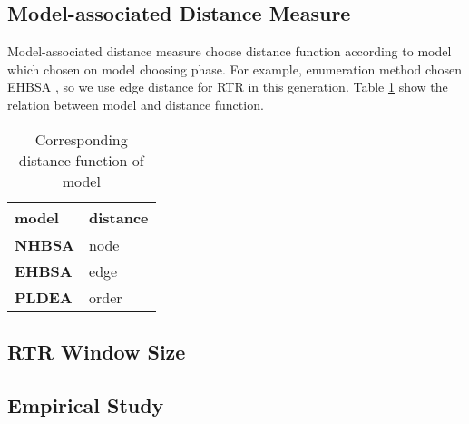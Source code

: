 \subsection{Model-associated Distance Measure}
Model-associated distance measure choose distance function according to model which chosen on model choosing phase. For example, enumeration method chosen EHBSA , so we use edge distance for RTR in this generation. Table \ref{tb:model_distance} show the relation between model and distance function.

\begin{table}[htbp]
    \centering
    \begin{tabular}{|l|l|}
    \hline
    \textbf{model}       & \textbf{distance}  \\ \hline
    \textbf{NHBSA} & node     	 \\ \hline
    \textbf{EHBSA} & edge   	\\ \hline
    \textbf{PLDEA} & order   	\\ \hline
  
    \end{tabular} 
    \caption{Corresponding distance function of model}
    \label{tb:model_distance}
\end{table}


\subsection{RTR Window Size}
\subsection{Empirical Study}